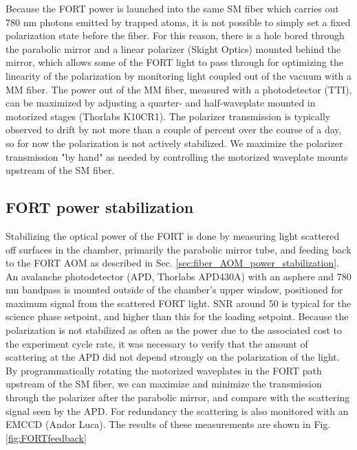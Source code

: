 
Because the FORT power is launched into the same SM fiber which carries out 780 nm photons emitted by trapped atoms, it is not possible to simply set a fixed polarization state before the fiber. For this reason, there is a hole bored through the parabolic mirror and a linear polarizer (Skight Optics) mounted behind the mirror, which allows some of the FORT light to pass through for optimizing the linearity of the polarization by monitoring light coupled out of the vacuum with a MM fiber. The power out of the MM fiber, measured with a photodetector (TTI), can be maximized by adjusting a quarter- and half-waveplate mounted in motorized stages (Thorlabs K10CR1). The polarizer transmission is typically observed to drift by not more than a couple of percent over the course of a day, so for now the polarization is not actively stabilized. We maximize the polarizer transmission "by hand" as needed by controlling the motorized waveplate mounts upstream of the SM fiber.


\subsection{FORT power stabilization}

Stabilizing the optical power of the FORT is done by measuring light scattered off surfaces in the chamber, primarily the parabolic mirror tube, and feeding back to the FORT AOM as described in Sec. \ref{sec:fiber_AOM_power_stabilization}. An avalanche photodetector (APD, Thorlabs APD430A) with an asphere and 780 nm bandpass is mounted outside of the chamber's upper window, positioned for maximum signal from the scattered FORT light. SNR around 50 is typical for the science phase setpoint, and higher than this for the loading setpoint. Because the polarization is not stabilized as often as the power due to the associated cost to the experiment cycle rate, it was necessary to verify that the amount of scattering at the APD did not depend strongly on the polarization of the light. By programmatically rotating the motorized waveplates in the FORT path upstream of the SM fiber, we can maximize and minimize the transmission through the polarizer after the parabolic mirror, and compare with the scattering signal seen by the APD. For redundancy the scattering is also monitored with an EMCCD (Andor Luca). The results of these measurements are shown in Fig. \ref{fig:FORTfeedback}

